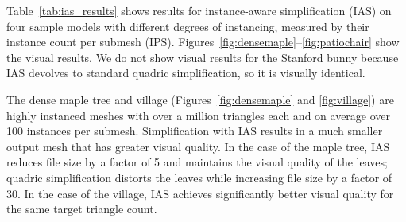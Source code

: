 


Table~\ref{tab:ias_results} shows results for
instance-aware simplification (IAS) on four sample models with
different degrees of instancing, measured by their instance count
per submesh (IPS). Figures~\ref{fig:densemaple}--\ref{fig:patiochair} show the 
visual results.  We do not show visual results for the Stanford bunny because
IAS devolves to standard quadric simplification, so it is visually
identical.

The dense maple tree and village (Figures~\ref{fig:densemaple}
and \ref{fig:village}) are
highly instanced meshes with over a million triangles each and on
average over 100 instances per submesh.  Simplification with IAS
results in a much smaller output mesh that has greater visual quality.
In the case of the maple tree, IAS reduces file size by a factor of 5
and maintains the visual quality of the leaves; quadric simplification
distorts the leaves while increasing file size by a factor of 30. In
the case of the village, IAS achieves significantly better visual quality
for the same target triangle count.


